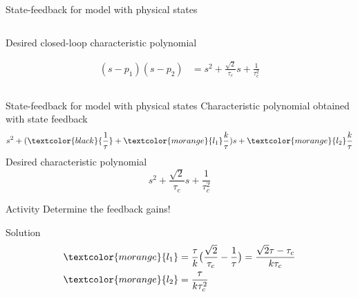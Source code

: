 \documentclass[presentation,aspectratio=169]{beamer}
\begin{document}
\begin{frame}[label={sec:org76cc716}]{State-feedback for model with physical states}
\begin{columns}
\begin{column}{0.4\columnwidth}
\begin{center}
\end{center}

Desired closed-loop characteristic polynomial

\begin{align*}
  (s-p_1)(s-p_2) &= s^2 + \frac{\sqrt{2}}{\tau_c}s + \frac{1}{\tau_c^2}
\end{align*}
\end{column}
\end{columns}
\end{frame}


\begin{frame}[label={sec:org60f8f9e}]{State-feedback for model with physical states}
Characteristic polynomial obtained with state feedback
\[s^2 + (\textcolor{black}{\frac{1}{\tau}}  + \textcolor{morange}{l_1}\frac{k}{\tau})s +  \textcolor{morange}{l_2}\frac{k}{\tau} \]
Desired characteristic polynomial
\[  s^2 + \frac{\sqrt{2}}{\tau_c}s + \frac{1}{\tau_c^2}\]
\pause

\alert{Activity}
Determine the feedback gains!

\pause
\alert{Solution}
\pause
\begin{align*}
 \textcolor{morange}{l_1} &= \frac{\tau}{k}\big(\frac{\sqrt{2}}{\tau_c} - \frac{1}{\tau}\big) = \frac{\sqrt{2}\tau - \tau_c}{k\tau_c}\\
 \textcolor{morange}{l_2} &= \frac{\tau}{k\tau_c^2} 
\end{align*}
\end{frame}
\end{document}
